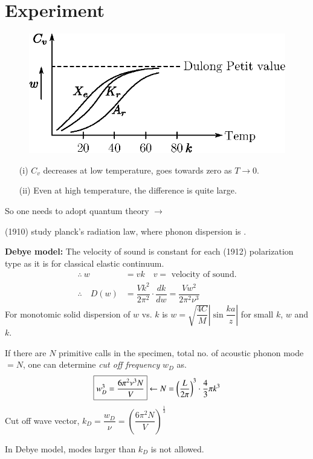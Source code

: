 \section*{Experiment}
\begin{figure}[H]
\centering
\includegraphics[scale=1.2]{images/lecture19/fig1.eps}
\end{figure}
\begin{itemize}
\item[(i)] $C_{v}$ decreases at low temperature, goes towards zero as $T\to 0$.

\item[(ii)] Even at high temperature, the difference is quite large.
\end{itemize}
So one needs to adopt quantum theory $\to$

(1910) study planck's radiation law, where phonon dispersion is .

\noindent
{\bf Debye model:} The velocity of sound is constant for each (1912) polarization type as it is for classical elastic continuum. 
\begin{align*}
\therefore \ w&= vk\quad v= \text{ velocity of sound.}\\
\therefore\quad D(w) &= \dfrac{Vk^{2}}{2\pi^{2}}\cdot \dfrac{dk}{dw}=\dfrac{Vw^{2}}{2\pi^{2}\nu^{3}}
\end{align*}
For monotomic solid dispersion of $w$ vs. $k$ is $w=\sqrt{\dfrac{4C}{M}}\left|\sin \dfrac{ka}{z}\right|$ for small $k$, $w$ and $k$.

If there are $N$ primitive calls in the specimen, total no. of acoustic phonon mode $=N$, one can determine {\em cut off frequency} $w_{D}$ as.
$$
\fbox{$w^{3}_{D}=\dfrac{6\pi^{2}\nu^{3}N}{V}$} \leftarrow N=\left(\dfrac{L}{2\pi}\right)^{3}\cdot \dfrac{4}{3}\pi k^{3}
$$
Cut off wave vector, $k_{D}=\dfrac{w_{D}}{\nu}=\left(\dfrac{6\pi^{2}N}{V}\right)^{\frac{1}{3}}$

In Debye model, modes larger than $k_{D}$ is not allowed.


